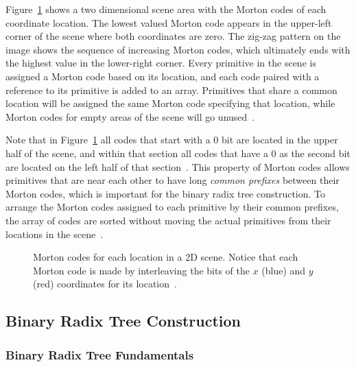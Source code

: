 \documentclass{sig-alternate}
\begin{document}
Figure~\ref{fig:MortonCodeFigure} shows a two dimensional scene area with the Morton codes of each coordinate location. The lowest valued Morton code appears in the upper-left corner of the scene where both coordinates are zero. The zig-zag pattern on the image shows the sequence of increasing Morton codes, which ultimately ends with the highest value in the lower-right corner. Every primitive in the scene is assigned a Morton code based on its location, and each code paired with a reference to its primitive is added to an array. Primitives that share a common location will be assigned the same Morton code specifying that location, while Morton codes for empty areas of the scene will go unused~\cite{Karras:2012, Viitanen:2015}.

Note that in Figure~\ref{fig:MortonCodeFigure} all codes that start with a 0 bit are located in the upper half of the scene, and within that section all codes that have a 0 as the second bit are located on the left half of that section~\cite{Garanzha:2011}. This property of Morton codes allows primitives that are near each other to have long \emph{common prefixes} between their Morton codes, which is important for the binary radix tree construction. To arrange the Morton codes assigned to each primitive by their common prefixes, the array of codes are sorted without moving the actual primitives from their locations in the scene~\cite{Viitanen:2015}.

\begin{figure}
\centering
{}
\caption{Morton codes for each location in a 2D scene. Notice that each Morton code is made by interleaving the bits of the $x$ (blue) and $y$ (red) coordinates for its location~\cite{wiki:morton}.}
\label{fig:MortonCodeFigure}
\end{figure} 

\subsection{Binary Radix Tree Construction}
\label{sec:brts}

\subsubsection{Binary Radix Tree Fundamentals}
\label{sec:brtFundamentals}
\end{document}
